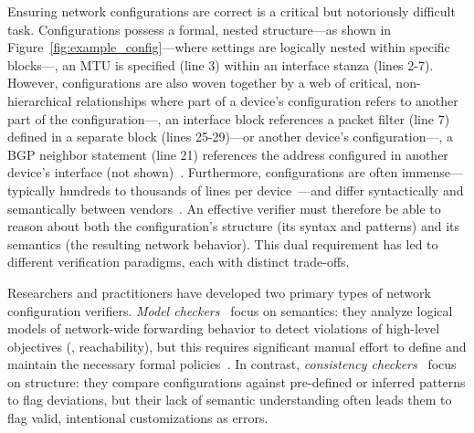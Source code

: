 Ensuring network configurations are correct is a critical but notoriously difficult task. 
Configurations possess a formal, nested structure---as shown in Figure~\ref{fig:example_config}---where settings are logically nested within specific blocks---\eg, an MTU is specified (line 3) within an interface stanza (lines 2-7). However, configurations are also woven together by a web of critical, non-hierarchical relationships where part of a device's configuration refers to another part of the configuration---\eg, an interface block references a packet filter (line 7) defined in a separate block (lines 25-29)---or another device's configuration---\eg, a BGP neighbor statement (line 21) references the address configured in another device's interface (not shown)~\cite{benson2009complexitymetrics, maltz2004routing}.
Furthermore, configurations are often immense---typically hundreds to thousands of lines per device~\cite{benson2011evolution, feamster2005detecting}---and differ syntactically and semantically between vendors~\cite{benson2009complexitymetrics, tang2021campion, ye2020hoyan}.
An effective verifier must therefore be able to reason about both the configuration's structure (its syntax and patterns) and its semantics (the resulting network behavior). This dual requirement has led to different verification paradigms, each with distinct trade-offs.

Researchers and practitioners have developed two primary types of network configuration verifiers. {\em Model checkers}~\cite{fogel2015general, batfish} focus on semantics: they analyze logical models of network-wide forwarding behavior to detect violations of high-level objectives (\eg, reachability), but this requires significant manual effort to define and maintain the necessary formal policies~\cite{ye2020hoyan}. In contrast, {\em consistency checkers}~\cite{kakarla2024diffy, le2006minerals} focus on structure: they compare configurations against pre-defined or inferred patterns to flag deviations, but their lack of semantic understanding often leads them to flag valid, intentional customizations as errors.

